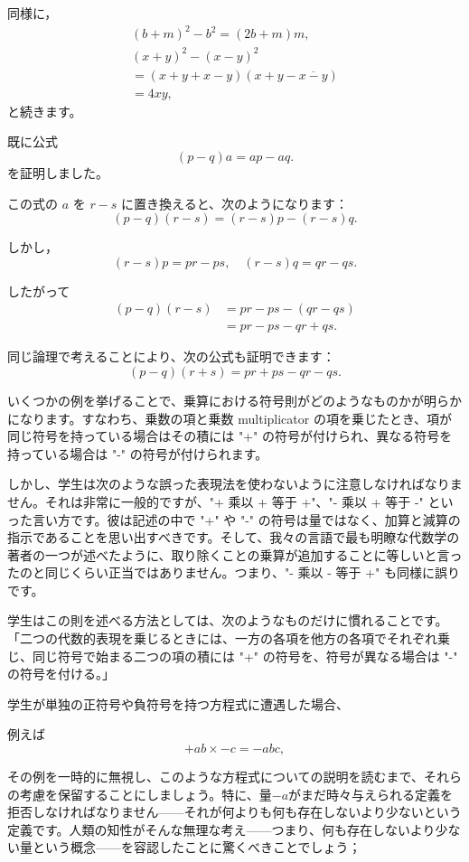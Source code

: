 \documentclass[a4paper,11pt,openany]{ltjsbook}
\begin{document}
同様に，
\begin{gather*}
(b + m)^{2} - b^{2} = (2b + m)m, \\
(x + y)^{2} - (x - y)^{2} \\
  = (x + y + x - y)(x + y - \overline{x - y}) \\
  = 4xy,
\end{gather*}
と続きます。

既に公式
\[
(p - q)a = ap - aq.
\]
を証明しました。

この式の $a$ を $r - s$ に置き換えると、次のようになります：
\[
(p - q)(r - s) = (r - s)p - (r - s)q.
\]

しかし，
\[
(r - s)p = pr - ps, \quad (r - s)q = qr - qs.
\]

したがって
\begin{align*}
(p - q)(r - s)
  &= pr - ps - (qr - qs) \\
  &= pr - ps - qr + qs.
\end{align*}

同じ論理で考えることにより、次の公式も証明できます：
\[
(p - q)(r + s) = pr + ps - qr - qs.
\]

いくつかの例を挙げることで、乗算における符号則がどのようなものかが明らかになります。すなわち、乗数の項と乗数 multiplicator の項を乗じたとき、項が同じ符号を持っている場合はその積には "+" の符号が付けられ、異なる符号を持っている場合は "-" の符号が付けられます。

しかし、学生は次のような誤った表現法を使わないように注意しなければなりません。それは非常に一般的ですが、"+ 乘以 + 等于 +"、"- 乘以 + 等于 -" といった言い方です。彼は記述の中で "+" や "-" の符号は量ではなく、加算と減算の指示であることを思い出すべきです。そして、我々の言語で最も明瞭な代数学の著者の一つが述べたように、取り除くことの乗算が追加することに等しいと言ったのと同じくらい正当ではありません。つまり、"- 乘以 - 等于 +" も同様に誤りです。

学生はこの則を述べる方法としては、次のようなものだけに慣れることです。「二つの代数的表現を乗じるときには、一方の各項を他方の各項でそれぞれ乗じ、同じ符号で始まる二つの項の積には "+" の符号を、符号が異なる場合は "-" の符号を付ける。」

学生が単独の正符号や負符号を持つ方程式に遭遇した場合、




例えば
\[
+ab \times -c = -abc,
\]

その例を一時的に無視し、このような方程式についての説明を読むまで、それらの考慮を保留することにしましょう。特に、量$-a$がまだ時々与えられる定義を拒否しなければなりません——それが何よりも何も存在しないより少ないという定義です。人類の知性がそんな無理な考え——つまり、何も存在しないより少ない量という概念——を容認したことに驚くべきことでしょう；
\end{document}
